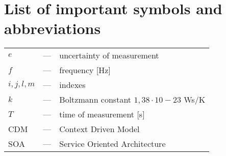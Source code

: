 \chapter*{List of important symbols and abbreviations}

\noindent
\begin{tabularx}{\textwidth}{p{1.25cm}p{0.75cm}X}
	$e$				& ---	& uncertainty of measurement \\
	$f$				& ---	& frequency [Hz] \\
	$i, j, l, m$	& --–	& indexes \\
	$k$				& --–	& Boltzmann constant $1,38 \cdot 10-23$ Ws/K \\
	$T$ 			& --– 	& time of measurement [s] \\
	CDM				& --– 	& Context Driven Model \\
	SOA				& --– 	& Service Oriented Architecture
\end{tabularx}

